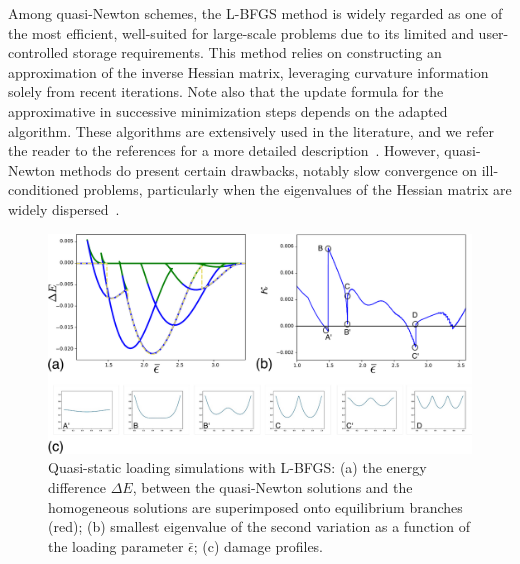 Among quasi-Newton schemes, the L-BFGS method is widely regarded as one of the most efficient, well-suited for large-scale problems due to its limited and user-controlled storage requirements. This method relies on constructing an approximation of the inverse Hessian matrix, leveraging curvature information solely from recent iterations. Note also that the update formula for the approximative in successive minimization steps depends on the adapted algorithm. These algorithms are extensively used in the literature, and we refer the reader to the references for a more detailed description~\cite{Matthies1979-gl,Xu2001-ax,Nocedal1999-zr,Nocedal2006-qh,Simone2012-tx,Lewis2013-eu,Curtis2015-wp}. However, quasi-Newton methods do present certain drawbacks, notably slow convergence on ill-conditioned problems, particularly when the eigenvalues of the Hessian matrix are widely dispersed~\cite{Simone2012-tx}.
\begin{figure}
\includegraphics[scale=0.23]{final_images/fig5.pdf}
    \caption{
        Quasi-static loading simulations with L-BFGS: (a) the energy difference $\Delta E$, between the quasi-Newton solutions and the homogeneous solutions are superimposed onto equilibrium branches (red); (b) smallest eigenvalue of the second variation  as a function of the loading parameter $\bar\epsilon$; (c) damage profiles.}
    \label{fig:tempo2}
\end{figure}


